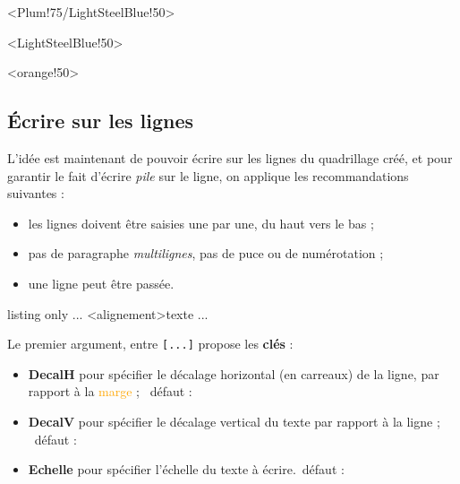 \documentclass[a4paper]{article}
\newcommand\Cle[1]{{\bfseries\sffamily\textlangle #1\textrangle}}
\begin{document}
\medskip

\begin{EnvQuadrillage}[NbCarreaux=18x4,Grille=Seyes,Marge=3]<Plum!75/LightSteelBlue!50>
\end{EnvQuadrillage}

\smallskip

\begin{EnvQuadrillage}[NbCarreaux=36x8,Elargir=3/3,Cadre]<LightSteelBlue!50>
\end{EnvQuadrillage}

\begin{center}
	\begin{EnvQuadrillage}[NbCarreaux=12x3,Grille=Ruled,Marge=2]<orange!50>
\end{EnvQuadrillage}
\end{center}

\pagebreak

\subsection{Écrire sur les lignes}

L'idée est maintenant de pouvoir écrire sur les lignes du quadrillage créé, et pour garantir le fait d'écrire \textit{pile} sur le ligne, on applique les recommandations suivantes :

\begin{itemize}
	\item les lignes doivent être saisies une par une, du \og haut \fg{} vers le \og bas \fg{} ;
	\item pas de paragraphe \textit{multilignes}, pas de puce ou de numérotation ;
	\item une ligne peut être passée.
\end{itemize}

\begin{PresentationCode}{listing only}
...
	\EcrireLigne[clés]<alignement>{texte}
	\PasseLigne
...
\end{PresentationCode}

Le premier argument, entre \texttt{[...]} propose les \Cle{clés} :

\begin{itemize}
	\item \Cle{DecalH} pour spécifier le décalage horizontal (en carreaux) de la ligne, par rapport à la \textcolor{orange}{marge} ; \hfill~défaut : \Cle{0}
	\item \Cle{DecalV} pour spécifier le décalage vertical du texte par rapport à la ligne ; \hfill~défaut : \Cle{0pt}
	\item \Cle{Echelle} pour spécifier l'échelle du texte à écrire.\hfill~défaut : \Cle{1}
\end{itemize}
\end{document}
